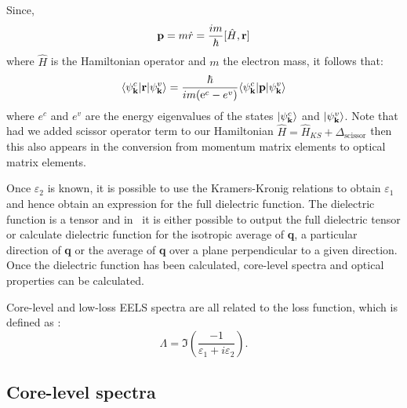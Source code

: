 \documentclass[a4paper,11pt,twoside]{book}
\newcommand{\e}{\mathrm{e}}
\begin{document}
Since,
\begin{equation}
{\bf p} = m\dot{r} =\frac{im}{\hbar} [\hat{H},{\bf r}]
\label{Eqn:velocity_op}
\end{equation}
where $\hat{H}$ is the Hamiltonian operator and $m$ the electron mass, it follows that:
\begin{equation}
\langle \psi^c_{\bf k}  |  {\bf r} | \psi^v_{\bf k} \rangle = \frac{\hbar} {im (\e^c-e^v)} \langle \psi^c_{\bf k}  |  {\bf p} | \psi^v_{\bf k} \rangle
\label{Eqn:pvr}
\end{equation}
where $e^c$ and $e^v$ are the energy eigenvalues of the states $|\psi^c_{\bf k} \rangle$ and $|\psi^v_{\bf k} \rangle$.
%
Note that had we added scissor operator term to our Hamiltonian $\hat{H} = \hat{H}_{KS} + \Delta_{\mathrm{scissor}}$ then this also appears in the conversion from momentum matrix elements to optical matrix elements.

Once $\varepsilon_2$ is known, it is possible to use the Kramers-Kronig relations to obtain $\varepsilon_1$ and hence obtain an expression for the full dielectric function.  The dielectric function is a tensor and in \optados\ it is either possible to output the full dielectric tensor or calculate dielectric function for the isotropic average of {\bf q}, a particular direction of {\bf q} or the average of {\bf q} over a plane perpendicular to a given direction.  Once the dielectric function has been calculated, core-level spectra and optical properties can be calculated.

Core-level and low-loss EELS spectra are all related to the loss function, which is defined as \cite{egerton}:
\begin{equation}
\Lambda = \Im \left ( \frac{-1}{\varepsilon_1 + i\varepsilon_2  } \right ).
\label{Eqn:LossFn}
\end{equation}


\subsection{Core-level spectra}
\end{document}
